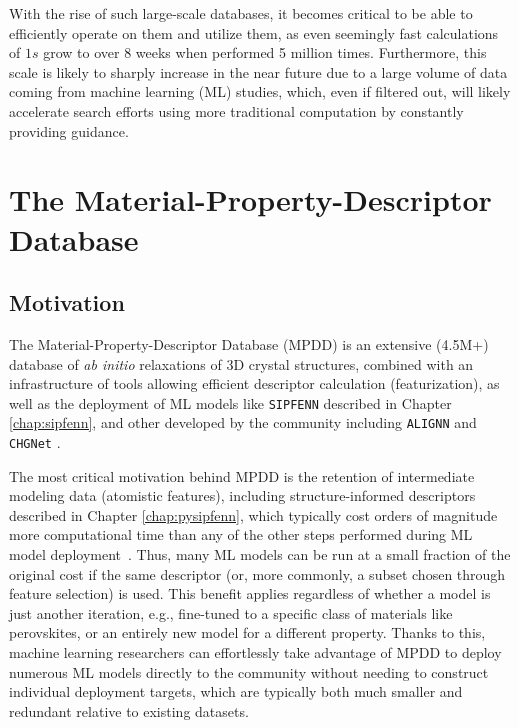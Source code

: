 With the rise of such large-scale databases, it becomes critical to be able to efficiently operate on them and utilize them, as even seemingly fast calculations of $1s$ grow to over 8 weeks when performed 5 million times. Furthermore, this scale is likely to sharply increase in the near future due to a large volume of data coming from machine learning (ML) studies, which, even if filtered out, will likely accelerate search efforts using more traditional computation by constantly providing guidance.


\section{The Material-Property-Descriptor Database} \label{mpdd:sec:mpdd}

\subsection{Motivation} \label{mpdd:ssec:motivation}

The Material-Property-Descriptor Database (MPDD) is an extensive (4.5M+) database of \emph{ab initio} relaxations of 3D crystal structures,  combined with an infrastructure of tools allowing efficient descriptor calculation (featurization), as well as the deployment of ML models like \texttt{SIPFENN} \cite{Krajewski2024EfficientStructures} described in Chapter \ref{chap:sipfenn}, and other developed by the community including \texttt{ALIGNN} \cite{Choudhary2021AtomisticPredictions} and \texttt{CHGNet} \cite{Deng2023CHGNetModelling}.

The most critical motivation behind MPDD is the retention of intermediate modeling data (atomistic features), including structure-informed descriptors described in Chapter \ref{chap:pysipfenn}, which typically cost orders of magnitude more computational time than any of the other steps performed during ML model deployment~\cite{Krajewski2022ExtensibleNetworks}. Thus, many ML models can be run at a small fraction of the original cost if the same descriptor (or, more commonly, a subset chosen through feature selection) is used. This benefit applies regardless of whether a model is just another iteration, e.g., fine-tuned to a specific class of materials like perovskites, or an entirely new model for a different property. Thanks to this, machine learning researchers can effortlessly take advantage of MPDD to deploy numerous ML models directly to the community without needing to construct individual deployment targets, which are typically both much smaller and redundant relative to existing datasets.

